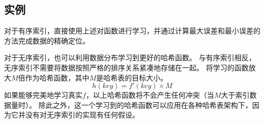 
\subsection{{\li}实例}

对于有序索引，{\li}直接使用上述{\rmi}对{\cdf}函数进行学习，并通过计算最大误差和最小误差的方法完成数据的精确定位。

对于无序索引，{\li}也可以利用数据分布学习到更好的哈希函数。
与有序索引相反，无序索引不需要将数据按照严格的排序关系紧凑地存储在一起。
{\li}将学习的{\cdf}函数放大$M$倍作为哈希函数，其中$M$是哈希表的目标大小。
\[ h(key) = f'(key) \times M \]
如果{\rmi}能够完美地学习真实{\cdf}$f$，以上哈希函数将不会产生任何冲突（当$M$大于索引数据量时）。
除此之外，这一个学习到的哈希函数可以应用在各种哈希表架构下，因为它并没有对无序索引的实现有任何假设。



